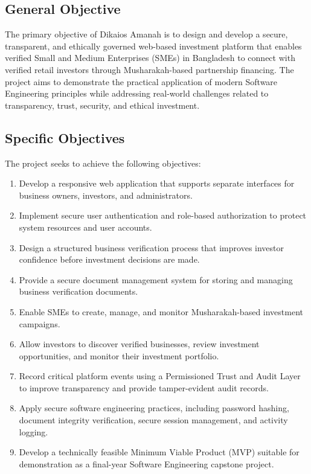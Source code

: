 \subsection{General Objective}

The primary objective of Dikaios Amanah is to design and develop a secure, transparent, and ethically governed web-based investment platform that enables verified Small and Medium Enterprises (SMEs) in Bangladesh to connect with verified retail investors through Musharakah-based partnership financing. The project aims to demonstrate the practical application of modern Software Engineering principles while addressing real-world challenges related to transparency, trust, security, and ethical investment.


\subsection{Specific Objectives}

The project seeks to achieve the following objectives:

\begin{enumerate}
    \item Develop a responsive web application that supports separate interfaces for business owners, investors, and administrators.

    \item Implement secure user authentication and role-based authorization to protect system resources and user accounts.

    \item Design a structured business verification process that improves investor confidence before investment decisions are made.

    \item Provide a secure document management system for storing and managing business verification documents.

    \item Enable SMEs to create, manage, and monitor Musharakah-based investment campaigns.

    \item Allow investors to discover verified businesses, review investment opportunities, and monitor their investment portfolio.

    \item Record critical platform events using a Permissioned Trust and Audit Layer to improve transparency and provide tamper-evident audit records.

    \item Apply secure software engineering practices, including password hashing, document integrity verification, secure session management, and activity logging.

    \item Develop a technically feasible Minimum Viable Product (MVP) suitable for demonstration as a final-year Software Engineering capstone project.

\end{enumerate}

